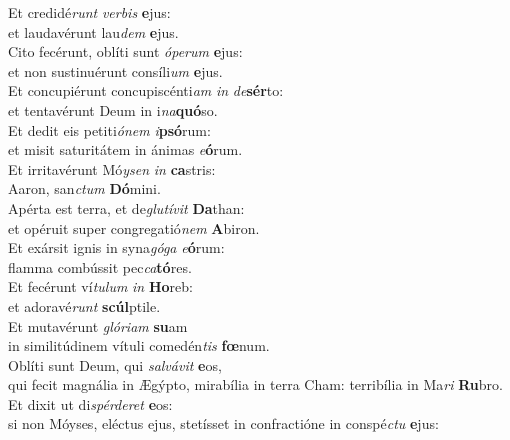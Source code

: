 \oddverse Et credidé\textit{runt} \textit{ver}\textit{bis} \textbf{e}jus:~\*\\
\oddverse et laudavérunt lau\textit{dem} \textbf{e}jus.\\
\evenverse Cito fecérunt, oblíti sunt \textit{ó}\textit{pe}\textit{rum} \textbf{e}jus:~\*\\
\evenverse et non sustinuérunt consíli\textit{um} \textbf{e}jus.\\
\oddverse Et concupiérunt concupiscénti\textit{am} \textit{in} \textit{de}\textbf{sér}to:~\*\\
\oddverse et tentavérunt Deum in i\textit{na}\textbf{quó}so.\\
\evenverse Et dedit eis petiti\textit{ó}\textit{nem} \textit{i}\textbf{psó}rum:~\*\\
\evenverse et misit saturitátem in ánimas \textit{e}\textbf{ó}rum.\\
\oddverse Et irritavérunt Mó\textit{y}\textit{sen} \textit{in} \textbf{ca}stris:~\*\\
\oddverse Aaron, san\textit{ctum} \textbf{Dó}mini.\\
\evenverse Apérta est terra, et de\textit{glu}\textit{tí}\textit{vit} \textbf{Da}than:~\*\\
\evenverse et opéruit super congregatió\textit{nem} \textbf{A}biron.\\
\oddverse Et exársit ignis in syna\textit{gó}\textit{ga} \textit{e}\textbf{ó}rum:~\*\\
\oddverse flamma combússit pec\textit{ca}\textbf{tó}res.\\
\evenverse Et fecérunt ví\textit{tu}\textit{lum} \textit{in} \textbf{Ho}reb:~\*\\
\evenverse et adoravé\textit{runt} \textbf{scúl}ptile.\\
\oddverse Et mutavérunt \textit{gló}\textit{ri}\textit{am} \textbf{su}am~\*\\
\oddverse in similitúdinem vítuli comedén\textit{tis} \textbf{fœ}num.\\
\evenverse Oblíti sunt Deum, qui \textit{sal}\textit{vá}\textit{vit} \textbf{e}os,~\*\\
\evenverse qui fecit magnália in Ægýpto, mirabília in terra Cham: terribília in Ma\textit{ri} \textbf{Ru}bro.\\
\oddverse Et dixit ut di\textit{spér}\textit{de}\textit{ret} \textbf{e}os:~\*\\
\oddverse si non Móyses, eléctus ejus, stetísset in confractióne in conspé\textit{ctu} \textbf{e}jus:\\
